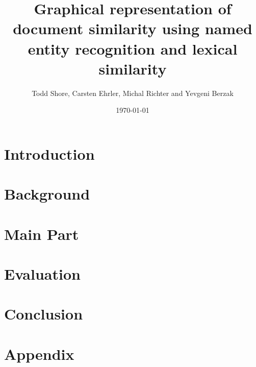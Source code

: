\documentclass[12pt]{article}
\title{Graphical representation of document similarity using named entity recognition and lexical similarity}
\author{Todd Shore, Carsten Ehrler, Michal Richter and Yevgeni Berzak}
\date{\today}
\begin{document}
\ifpdf
{}
\else
{}
\fi

\maketitle
\tableofcontents

\begin{abstract}
\end{abstract}


\section{Introduction} %
\label{sec:introduction}



\section{Background} %
\label{sec:background}



\section{Main Part}
\label{sec:main_part}



\section{Evaluation}
\label{sec:evaluation}



\section{Conclusion}
\label{sec:conclusion}



\section{Appendix}



\end{document}
